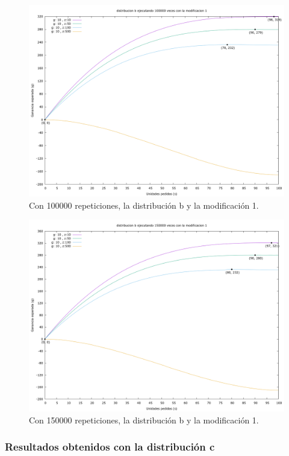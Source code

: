 \documentclass[12pt, spanish]{article}
\begin{document}
\begin{figure}[H]
	\centering
	\includegraphics[scale = 0.2]{prob_b/datos_b_100000_1.png}
	\caption{Con 100000 repeticiones, la distribución b y la modificación 1.}
	\label{fig:ej1_a_100000}

\end{figure}

\begin{figure}[H]
	\centering
	\includegraphics[scale = 0.2]{prob_b/datos_b_150000_1.png}
	\caption{Con 150000 repeticiones, la distribución b y la modificación 1.}
	\label{fig:ej1_a_150000}

\end{figure}

\subsubsection{Resultados obtenidos con la distribución c}
\end{document}
